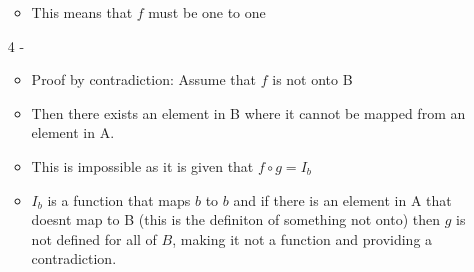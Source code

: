 \documentclass{article}
\begin{document}
\begin{itemize}
\begin{itemize}
        \item This means that $f$ must be one to one
    \end{itemize}
    \item [4] - \begin{itemize}
        \item Proof by contradiction: Assume that $f$ is not onto B
        \item Then there exists an element in B where it cannot be mapped from an element in A. 
        \item This is impossible as it is given that $f \circ g = I_b$
        \item $I_b$ is a function that maps $b$ to $b$ and if there is an element in A that doesnt map to B (this is the definiton of something not onto) then $g$ is not defined for all of $B$, making it not a function and providing a contradiction. 
    \end{itemize}
\end{itemize}
\end{document}
